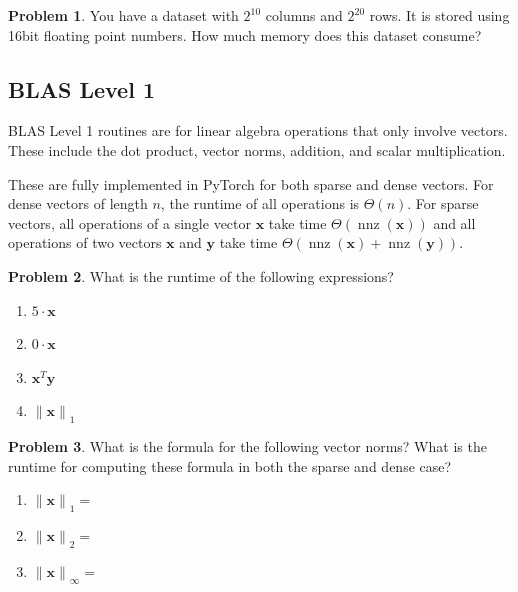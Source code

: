 \documentclass[10pt]{article}
\theoremstyle{definition}
\newtheorem{problem}{Problem}
\DeclareMathOperator{\nnz}{nnz}
\newcommand{\trans}[1]{{#1}^{T}}
\newcommand{\x}{\mathbf x}
\newcommand{\y}{\mathbf y}
\newcommand{\lone}[1]{{\lVert {#1} \rVert}_1}
\newcommand{\ltwo}[1]{{\lVert {#1} \rVert}_2}
\newcommand{\lp}[1]{{\lVert {#1} \rVert}_p}
\newcommand{\linf}[1]{{\lVert {#1} \rVert}_\infty}
\begin{document}
\begin{problem}
    You have a dataset with $2^{10}$ columns and $2^{20}$ rows.
    It is stored using 16bit floating point numbers.
    How much memory does this dataset consume?
    \vspace{4in}
\end{problem}

\newpage
\subsection{BLAS Level 1}

BLAS Level 1 routines are for linear algebra operations that only involve vectors.
These include the dot product, vector norms, addition, and scalar multiplication.

These are fully implemented in PyTorch for both sparse and dense vectors.
For dense vectors of length $n$, the runtime of all operations is $\Theta(n)$.
For sparse vectors, all operations of a single vector $\x$ take time $\Theta(\nnz(\x))$
and all operations of two vectors $\x$ and $\y$ take time $\Theta(\nnz(\x)+\nnz(\y))$.

\begin{problem}
    What is the runtime of the following expressions?
    \begin{enumerate}
        \item $5 \cdot \x$
            \vspace{2in}
        \item $0 \cdot \x$
            \vspace{2in}
        \item $\trans\x \y$
            \vspace{2in}
        \item $\lone{\x}$
            \vspace{2in}
    \end{enumerate}
\end{problem}

\begin{problem}
    What is the formula for the following vector norms?
    What is the runtime for computing these formula in both the sparse and dense case?
    \begin{enumerate}
        \item $\lone{\x}=$
            \vspace{2in}
        \item $\ltwo{\x}=$
            \vspace{2in}
        \item $\linf{\x}=$
            \vspace{2in}
    \end{enumerate}
\end{problem}
\end{document}
